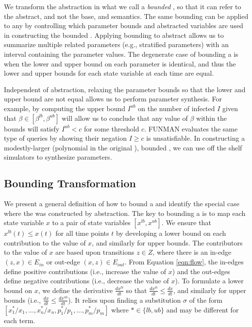 We transform the abstraction in what we call a \emph{bounded \Petrinet{}}, so that
it can refer to the abstract, and not the base, \Petrinet{} and semantics.  The same bounding can be applied to any \Petrinet{} by controlling which parameter bounds and abstracted variables are used in constructing the bounded \Petrinet{}.  Applying bounding to abstract \Petrinets{} allows us to summarize multiple related parameters (e.g., stratified parameters) with an interval containing the parameter values.  The degenerate case of bounding a \Petrinet{} is when the lower and upper bound on each parameter is identical, and thus the lower and upper bounds for each state variable at each time are equal.  

Independent of abstraction, relaxing the parameter bounds so that the lower and upper bound are not equal allows us to perform parameter synthesis.  For example, by computing the upper bound $I^{ub}$ on the number of infected $I$ given that $\beta \in [\beta^{lb}, \beta^{ub}]$ will allow us to conclude that any value of $\beta$ within the bounds will satisfy $I^{ub} < c$ for some threshold $c$.  FUNMAN evaluates the same type of queries by showing their negation $I \geq c$ is unsatisfiable.  In constructing a modestly-larger (polynomial in the original \Petrinet{}), bounded \Petrinet{}, we can use off the shelf simulators to synthesize parameters.

\subsection{Bounding Transformation}

We present a general definition of how to bound a \Petrinet{} and identify the special case where the \Petrinet{} was constructed by abstraction.  The key to bounding a \Petrinet{} is to map each state variable $x$ to a pair of state variables $[x^{lb}, x^{ub}]$.  We ensure that $x^{lb}(t) \leq x(t)$ for all time points $t$ by developing a lower bound on each contribution to the value of $x$, and similarly for upper bounds.  The contributors to the value of $x$ are based upon transitions $z\in Z$, where there is an in-edge $(z, x) \in E_{in}$ or out-edge $(x, z)  \in E_{out}$.  From Equation \ref{eqn:flow}, the in-edges define positive contributions (i.e., increase the value of $x$) and the out-edges define negative contributions (i.e., decrease the value of $x$).  To formulate a lower bound on $x$, we define the derivative $\frac{dx^{lb}}{dt}$ so that  $\frac{dx^{lb}}{dt} \leq \frac{dx}{dt}$, and similarly for upper bounds (i.e., $\frac{dx}{dt} \leq \frac{dx^{ub}}{dt}$).  It relies upon finding a substitution $\sigma$ of the form $[x_1^{*}/x_1, \ldots, x_n^{*}/x_n, p_1^{*}/p_1, \ldots, p_m^{*}/p_m]$ where $* \in \{lb,ub\}$ and may be different for each term.  



